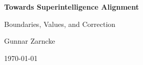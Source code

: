\begin{titlingpage*}
  \centering
  \vspace*{2cm}
  {\Huge\bfseries Towards Superintelligence Alignment\par}
  \vspace{1cm}
  {\Large Boundaries, Values, and Correction\par}
  \vspace{2cm}
  {\Large Gunnar Zarncke\par}
  \vfill
  {\large \today\par}
\end{titlingpage*}
